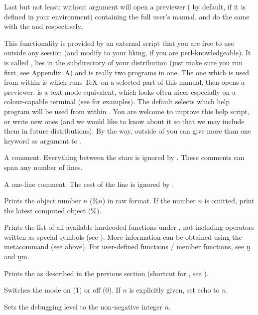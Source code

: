 Last but not least:  without argument will open a 
previewer ( by default,  if it is defined in your
environment) containing the full user's manual.  and
 do the same with the  and 
respectively.

 This functionality is provided by an
external  script that you are free to use outside any  session
(and modify to your liking, if you are perl-knowledgeable). It is called
, lies in the  subdirectory of your distribution
(just make sure you run  first, see Appendix~A) and is
really two programs in one. The one which is used from within  is
 which runs \TeX\ on a selected part of this manual, then opens
a previewer.  is a text mode equivalent, which looks
often nicer especially on a colour-capable terminal (see
 for examples). The default  selects which
help program will be used from within . You are welcome to improve this
help script, or write new ones (and we would like to know about it
so that we may include them in future distributions). By the way, outside
of  you can give more than one keyword as argument to .

 A comment. Everything between the stars is ignored by
. These comments can span any number of lines.

\subseckbd{\bs\bs} A one-line comment. The rest of the line
is ignored by .

 Prints the object number $n$ ($\%n$)
in raw format. If the number $n$ is omitted, print the latest computed object
($\%$). \label{se:history}

 Prints the list of all available
hardcoded functions under , not including operators written as special
symbols (see ). More information can be obtained using
the  metacommand (see above). For user-defined functions / member
functions, see \b{u} and \b{um}.

 Prints the  as described in the
previous section (shortcut for , see ).

 Switches the  mode on (1) or off (0). If
$n$ is explicitly given, set echo to $n$.

 Sets the debugging level  to the
non-negative integer $n$.

